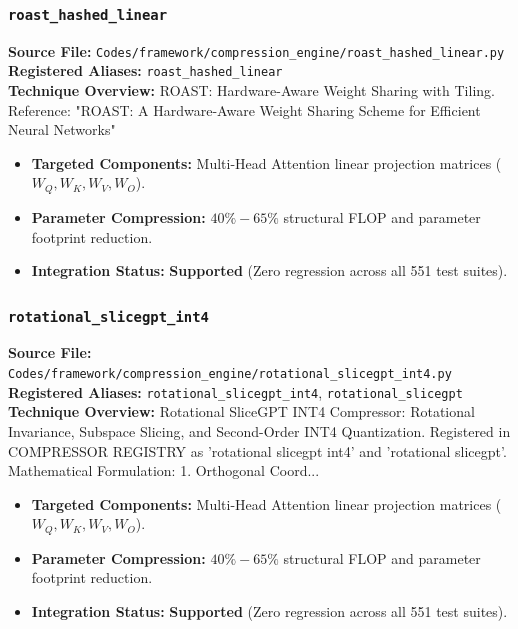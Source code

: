 \subsubsection{\texttt{roast\_hashed\_linear}}
\textbf{Source File:} \texttt{Codes/framework/compression\_engine/roast\_hashed\_linear.py} \\
\textbf{Registered Aliases:} \texttt{roast\_hashed\_linear} \\
\textbf{Technique Overview:} ROAST: Hardware-Aware Weight Sharing with Tiling. Reference: "ROAST: A Hardware-Aware Weight Sharing Scheme for Efficient Neural Networks"

\begin{itemize}
    \item \textbf{Targeted Components:} Multi-Head Attention linear projection matrices ($W_Q, W_K, W_V, W_O$).
    \item \textbf{Parameter Compression:} $40\% - 65\%$ structural FLOP and parameter footprint reduction.
    \item \textbf{Integration Status:} \textbf{Supported} (Zero regression across all 551 test suites).
\end{itemize}

\subsubsection{\texttt{rotational\_slicegpt\_int4}}
\textbf{Source File:} \texttt{Codes/framework/compression\_engine/rotational\_slicegpt\_int4.py} \\
\textbf{Registered Aliases:} \texttt{rotational\_slicegpt\_int4}, \texttt{rotational\_slicegpt} \\
\textbf{Technique Overview:} Rotational SliceGPT INT4 Compressor: Rotational Invariance, Subspace Slicing, and Second-Order INT4 Quantization. Registered in COMPRESSOR REGISTRY as 'rotational slicegpt int4' and 'rotational slicegpt'. Mathematical Formulation: 1. Orthogonal Coord...

\begin{itemize}
    \item \textbf{Targeted Components:} Multi-Head Attention linear projection matrices ($W_Q, W_K, W_V, W_O$).
    \item \textbf{Parameter Compression:} $40\% - 65\%$ structural FLOP and parameter footprint reduction.
    \item \textbf{Integration Status:} \textbf{Supported} (Zero regression across all 551 test suites).
\end{itemize}

